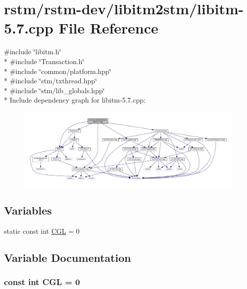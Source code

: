 \hypertarget{libitm-5_87_8cpp}{\section{rstm/rstm-\/dev/libitm2stm/libitm-\/5.7.cpp File Reference}
\label{libitm-5_87_8cpp}
}
{\ttfamily \#include \char`\"{}libitm.\-h\char`\"{}}\\*
{\ttfamily \#include \char`\"{}Transaction.\-h\char`\"{}}\\*
{\ttfamily \#include \char`\"{}common/platform.\-hpp\char`\"{}}\\*
{\ttfamily \#include \char`\"{}stm/txthread.\-hpp\char`\"{}}\\*
{\ttfamily \#include \char`\"{}stm/lib\-\_\-globals.\-hpp\char`\"{}}\\*
Include dependency graph for libitm-\/5.7.cpp\-:
\nopagebreak
\begin{figure}[H]
\begin{center}
\leavevmode
\includegraphics[width=350pt]{libitm-5_87_8cpp__incl}
\end{center}
\end{figure}
\subsection*{Variables}
\begin{DoxyCompactItemize}
\item 
static const int \hyperlink{libitm-5_87_8cpp_a98b962d553f9f94a9d6124bd472868f7}{C\-G\-L} = 0
\end{DoxyCompactItemize}


\subsection{Variable Documentation}
\hypertarget{libitm-5_87_8cpp_a98b962d553f9f94a9d6124bd472868f7}{
\subsubsection[{C\-G\-L}]{\setlength{\rightskip}{0pt plus 5cm}const int C\-G\-L = 0\hspace{0.3cm}{\ttfamily [static]}}}\label{libitm-5_87_8cpp_a98b962d553f9f94a9d6124bd472868f7}
